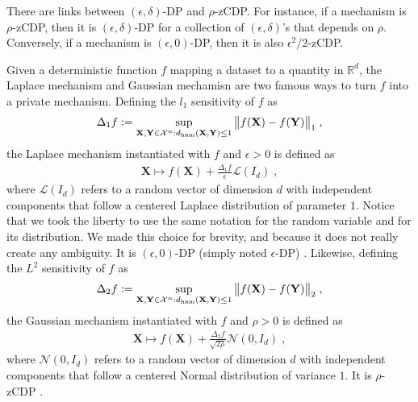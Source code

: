 \documentclass[10pt]{article} %
\newcommand{\R}[0]{\mathbb{R}}
\newcommand{\eqdef}{\vcentcolon=}
\newcommand\set[1]{\mathcal{#1}}
\newcommand\vect[1]{\mathbf{#1}}
\newcommand\ham[2]{d_\mathrm{ham}\left( {#1}, {#2} \right)}
\newcommand\AG[1]{\textcolor{magenta}{#1}}
\begin{document}
There are links between $(\epsilon, \delta)$-DP and $\rho$-zCDP. For instance, if a mechanism is $\rho$-zCDP, then  \citep[Proposition 3]{bun2016concentrated} it is $(\epsilon, \delta)$-DP for a collection of $(\epsilon, \delta)$'s that depends on $\rho$. Conversely,  if a mechanism is $(\epsilon, 0)$-DP, then \citep[Proposition 4]{bun2016concentrated} it is also $\epsilon^2/2$-zCDP.


Given a deterministic function $f$ mapping a dataset to a quantity in $\R^d$, the Laplace mechanism \citep{dwork2006calibrating} and Gaussian mechamisn \citep{bun2016concentrated} are two famous ways to turn $f$ into a private mechanism.
Defining the $l_1$ sensitivity of $f$ as
\begin{equation*}
\begin{aligned}
    \Delta_1 f \eqdef \sup_{\vect{X}, \vect{Y} \in \set{X}^n : \ham{\vect{X}}{\vect{Y}} \leq 1} \big\| f (\vect{X})  - f (\vect{Y})\big\|_1 \;,
\end{aligned}
\end{equation*}
the Laplace mechanism instantiated with $f$ and $\epsilon > 0$ is defined as
\begin{equation*}
    \begin{aligned}
        \vect{X} \mapsto f(\vect{X}) + \frac{\Delta_1 f}{\epsilon} \mathcal{L}(I_d) \;,
    \end{aligned}
\end{equation*}
where $\mathcal{L}(I_d)$ refers to a random vector of dimension $d$ with independent components that follow a centered Laplace distribution of parameter $1$. 
Notice that we took the liberty to use the same notation for the random variable and for its distribution. We made this choice for brevity, and because it does not really create any ambiguity.
It is $(\epsilon, 0)$-DP (simply noted $\epsilon$-DP) \citep{dwork2006our,dwork2006calibrating}.
Likewise, defining the $L^2$ sensitivity of $f$ as
\begin{equation*}
\begin{aligned}
    \Delta_2 f \eqdef \sup_{\vect{X}, \vect{Y} \in \set{X}^n : \ham{\vect{X}}{\vect{Y}} \leq 1} \big\| f (\vect{X})  - f (\vect{Y})\big\|_2 \;,
\end{aligned}
\end{equation*}
the Gaussian mechanism instantiated with $f$ and $\rho > 0$ is defined as
\begin{equation*}
    \begin{aligned}
        \vect{X} \mapsto f(\vect{X}) + \frac{\Delta_2 f}{\sqrt{2 \rho}} \mathcal{N}(0, I_d) \;,
    \end{aligned}
\end{equation*}
where $\mathcal{N}(0, I_d)$ refers to a random vector of dimension $d$ with independent components that follow a centered Normal distribution of variance $1$. It is $\rho$-zCDP \citep{bun2016concentrated}.
\end{document}
